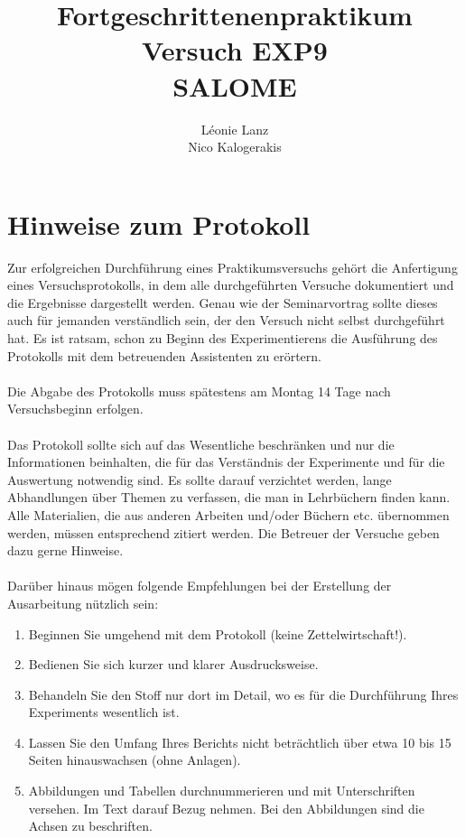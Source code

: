 \documentclass[10pt,a4paper]{article}
\begin{document}

\title{Fortgeschrittenenpraktikum\\ Versuch EXP9\\ SALOME }
\author{Léonie Lanz \\ Nico Kalogerakis}

\maketitle
\newpage

\tableofcontents
\vfill
\newpage


\section{Hinweise zum Protokoll}

Zur erfolgreichen Durchführung eines Praktikumsversuchs gehört die Anfertigung eines Versuchsprotokolls, in dem alle durchgeführten Versuche dokumentiert und die Ergebnisse dargestellt werden. Genau wie der Seminarvortrag sollte dieses auch für jemanden verständlich sein, der den Versuch nicht selbst durchgeführt hat. Es ist ratsam, schon zu Beginn des Experimentierens die Ausführung des Protokolls mit dem betreuenden Assistenten zu erörtern.\\
\\
Die Abgabe des Protokolls muss spätestens am Montag 14 Tage nach Versuchsbeginn erfolgen.\\
\\
Das Protokoll sollte sich auf das Wesentliche beschränken und nur die Informationen beinhalten, die für das Verständnis der Experimente und für die Auswertung notwendig sind. Es sollte darauf verzichtet werden, lange Abhandlungen über Themen zu verfassen, die man in Lehrbüchern finden kann. Alle Materialien, die aus anderen Arbeiten und/oder Büchern etc. übernommen werden, müssen entsprechend zitiert werden. Die Betreuer der Versuche geben dazu gerne Hinweise.\\
\\
Darüber hinaus mögen folgende Empfehlungen bei der Erstellung der Ausarbeitung nützlich sein:\\
\begin{enumerate}
\item Beginnen Sie umgehend mit dem Protokoll (keine Zettelwirtschaft!).
\item Bedienen Sie sich kurzer und klarer Ausdrucksweise.
\item Behandeln Sie den Stoff nur dort im Detail, wo es für die Durchführung Ihres Experiments wesentlich ist.
\item Lassen Sie den Umfang Ihres Berichts nicht beträchtlich über etwa 10 bis 15 Seiten hinauswachsen (ohne Anlagen).
\item Abbildungen und Tabellen durchnummerieren und mit Unterschriften versehen. Im Text darauf Bezug nehmen. Bei den Abbildungen sind die Achsen zu beschriften. 
\end{enumerate}
\end{document}
